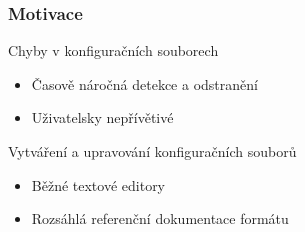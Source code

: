 \begin{frame}[t]
	\frametitle{Motivace}
	\begin{block}{Chyby v konfiguračních souborech}
	\begin{itemize}[<+->]
		\item Časově náročná detekce a odstranění
		\item Uživatelsky nepřívětivé
	\end{itemize}
	\end{block}
	
	\begin{block}{Vytváření a upravování konfiguračních souborů}
	\begin{itemize}[<+->]
		\item Běžné textové editory
		\item Rozsáhlá referenční dokumentace formátu
	\end{itemize}
	\end{block}
	
\end{frame}

